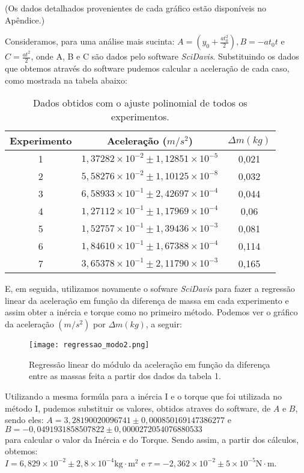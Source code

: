 \documentclass[a4papper, 10pt]{article}
\begin{document}
(Os dados detalhados provenientes de cada gráfico estão disponíveis no Apêndice.)

Consideramos, para uma análise mais sucinta: $A = \left(y_{0} + \frac{a t_0^2}{2}\right), B = - a t_{0} t$ e $C =  \frac{at^{2}}{2}$, onde A, B e C são dados pelo software \textit{SciDavis}. Substituindo os dados que obtemos através do software pudemos calcular a aceleração de cada caso, como mostrada na tabela abaixo:

\begin{table}[h!]
\centering
\caption{Dados obtidos com o ajuste polinomial de todos os experimentos.
}
\begin{tabular}{|c|c|c|}
\hline
\textbf{Experimento} & \textbf{Aceleração ($m/s^{2}$)} & \textbf{$\Delta m (kg)$} \\
\hline
1 & \( 1,37282 \times 10^{-2} \pm 1,12851 \times 10^{-5} \) & 0,021 \\
2 & \( 5,58276 \times 10^{-2} \pm 1,10125 \times 10^{-8} \) & 0,032 \\
3 & \( 6,58933 \times 10^{-1} \pm 2,42697 \times 10^{-4} \) & 0,044 \\
4 & \( 1,27112 \times 10^{-1} \pm 1,17969 \times 10^{-4} \) & 0,06 \\
5 & \( 1,52757 \times 10^{-1} \pm 1,39436 \times 10^{-3} \) & 0,081 \\
6 & \( 1,84610 \times 10^{-1} \pm 1,67388 \times 10^{-4} \) & 0,114 \\
7 & \( 3,65378 \times 10^{-1} \pm 2,11790 \times 10^{-3} \) & 0,165 \\
\hline
\end{tabular}
\end{table}
E, em seguida, utilizamos novamente o sofware \textit{SciDavis} para fazer a regressão linear da aceleração em função da diferença de massa em cada experimento e assim obter a inércia e torque como no primeiro método.
Podemos ver o gráfico da aceleração $(m/s^{2})$ por $\Delta m (kg)$, a seguir:

\begin{figure}[H]
    \centering
    \begin{minipage}[b]{0.9\textwidth}
        \texttt{[image: regressao\_modo2.png]}
    \end{minipage}
        \caption{Regressão linear do módulo da aceleração em função da diferença entre as massas feita a partir dos dados da tabela 1.}
        \label{fig:imagem1}  
\end{figure}

Utilizando a mesma formúla para a inércia I e o torque que foi utilizada no método I, pudemos substituir os valores, obtidos atraves do software, de \( A \) e \( B \), sendo eles: 
$A=3,28190020096741\pm 0,000850169147386277$ e $B = -0,0491931858507822\pm 0,0000272054076880533$
\\
para calcular o valor da Inércia e do Torque. Sendo assim, a partir dos cálculos, obtemos:
\\
$I =6,829 \times 10^{-2} \pm 2,8 \times 10^{-4}  \text{kg} \cdot \text{m}^2$ e 
$\tau = -2,362 \times 10^{-2} \pm 5 \times 10^{-5}\text{N} \cdot \text{m}$.
\end{document}
